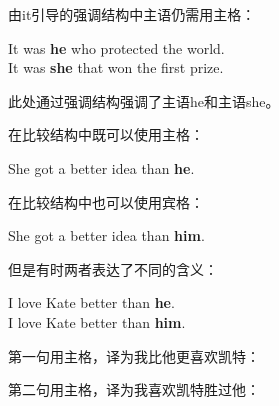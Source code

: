 \documentclass[UTF8]{ctexart}
\newcommand{\LiDrawContainer}[6][solid]
{
    \coordinate (A1) at #2;
    \coordinate (A2) at #3;
    \coordinate (B1) at ($#2+(0,#4)$);
    \coordinate (B2) at ($#3+(0,#4)$);

    \draw (A1)--(B1);
    \draw[#1] (A2)--(B2);
    \draw (B1)--(B2);

    \node at($0.5*(B1)+0.5*(B2)+(0,#5)$) {#6};
}
\begin{document}
    由{\hspace{3pt}\ttfamily it}引导的强调结构中主语仍需用主格：\vspace{3pt}
    \begin{center}
        \ttfamily\large
        It was \textbf{he} who protected the world.\\[3mm]
        It was \textbf{she} that won the first prize.\\[6mm]        
    \end{center}
    此处通过强调结构强调了主语{\hspace{3pt}\ttfamily he}和主语{\hspace{3pt}\ttfamily she}。

\newpage

    在比较结构中既可以使用主格：
    \begin{center}
        \ttfamily\large
        She got a better idea than \textbf{he}.\\[6mm]
    \end{center}
    在比较结构中也可以使用宾格：
    \begin{center}
        \ttfamily\large
        She got a better idea than \textbf{him}.\\[6mm]
    \end{center}
    但是有时两者表达了不同的含义：
    \begin{center}
        \ttfamily\large
        I love Kate better than \textbf{he}.\\[3mm]
        I love Kate better than \textbf{him}.\\[6mm]
    \end{center}
    第一句用主格，译为我比他更喜欢凯特：
    \begin{center}
    \end{center}
    第二句用主格，译为我喜欢凯特胜过他：
    \begin{center}
    \end{center}\vspace{5pt}
\end{document}
